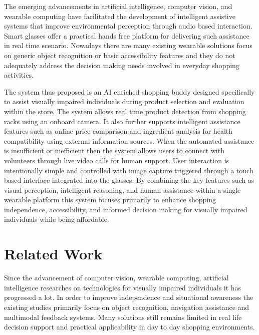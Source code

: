 \documentclass[conference]{IEEEtran}
\begin{document}
The emerging advancements in artificial intelligence, computer vision, and wearable computing have facilitated the development of intelligent assistive systems that improve environmental perception through audio based interaction. Smart glasses offer a practical hands free platform for delivering such assistance in real time scenario. Nowadays there are many existing wearable solutions focus on
generic object recognition or basic accessibility features and they do not adequately address the decision making needs involved in everyday shopping activities.

The system thus proposed is an AI enriched shopping buddy designed specifically to assist visually impaired individuals during product selection and evaluation within the store. The system allows real time product detection from shopping racks using an onboard camera. It also further supports intelligent assistance features such as online price comparison and ingredient analysis for health compatibility using external information sources. When the automated assistance is insufficient or inefficient then the system allows users to connect with volunteers through live video calls for human support. User interaction is intentionally simple and controlled with image capture triggered through a touch based interface integrated into the glasses. By combining the key features such as visual perception, intelligent reasoning, and human assistance within a single wearable platform this system focuses primarily to enhance shopping independence, accessibility, and informed decision making for visually impaired individuals while being affordable. 

\section{Related Work}
Since the advancement of computer vision, wearable computing, artificial intelligence researches on technologies for visually impaired individuals it has progressed a lot. In order to improve independence and situational awareness the existing studies primarily focus on object recognition, navigation assistance and multimodal feedback systems. Many solutions still remains limited in real life decision support and practical applicability in day to day shopping environments.
\end{document}
